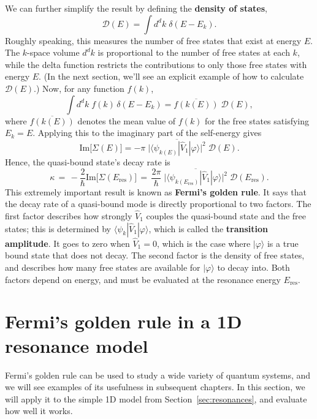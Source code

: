 \documentclass[pra,12pt]{revtex4}
\begin{document}
We can further simplify the result by defining the \textbf{density of
  states},
\begin{equation}
  \mathcal{D}(E) = \int d^d k\; \delta(E - E_k).
\end{equation}
Roughly speaking, this measures the number of free states that exist
at energy $E$.  The $k$-space volume $d^dk$ is proportional to the
number of free states at each $k$, while the delta function restricts
the contributions to only those free states with energy $E$.  (In
the next section, we'll see an explicit example of how to calculate
$\mathcal{D}(E)$.)  Now, for any function $f(k)$,
\begin{equation}
  \int d^d k\; f(k) \, \delta(E - E_k) = \overline{f(k(E))} \;\mathcal{D}(E),
\end{equation}
where $\overline{f(k(E))}$ denotes the mean value of $f(k)$ for the
free states satisfying $E_k = E$.  Applying this to the imaginary part
of the self-energy gives
\begin{equation}
  \mathrm{Im}\big[\Sigma(E)\big] = - \pi \; \overline{\Big| \langle\psi_{k(E)}| \hat{V}_1|\varphi\rangle\Big|^2} \; \mathcal{D}(E).
\end{equation}
Hence, the quasi-bound state's decay rate is
$$\boxed{\quad\kappa \,=\, -\frac{2}{\hbar}\mathrm{Im}\big[\Sigma(E_{\mathrm{res}})\big] \,=\, \frac{2\pi}{\hbar} \; \overline{\Big| \langle\psi_{k(E_{\mathrm{res}})}| \hat{V}_1|\varphi\rangle\Big|^2} \; \mathcal{D}(E_{\mathrm{res}}).\quad}$$
This extremely important result is known as \textbf{Fermi's golden
  rule}.  It says that the decay rate of a quasi-bound mode is
directly proportional to two factors.  The first factor describes how
strongly $\hat{V}_1$ couples the quasi-bound state and the free
states; this is determined by $\langle\psi_{k}|
\hat{V}_1|\varphi\rangle$, which is called the \textbf{transition
  amplitude}.  It goes to zero when $\hat{V}_1 = 0$, which is
the case where $|\varphi\rangle$ is a true bound state that does not
decay.  The second factor is the density of free states, and
describes how many free states are available for $|\varphi\rangle$ to
decay into.  Both factors depend on energy, and must be evaluated at
the resonance energy $E_{\mathrm{res}}$.

\section{Fermi's golden rule in a 1D resonance model}

Fermi's golden rule can be used to study a wide variety of quantum
systems, and we will see examples of its usefulness in subsequent
chapters.  In this section, we will apply it to the simple 1D model
from Section~\ref{sec:resonances}, and evaluate how well it works.
\end{document}
